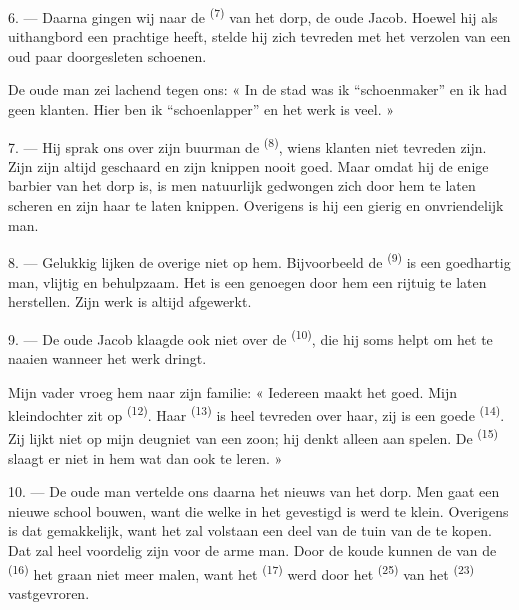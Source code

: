 6. --- Daarna gingen wij naar de  \textsuperscript{(7)} van het dorp, de
oude Jacob. Hoewel hij als uithangbord een prachtige  heeft, stelde hij zich
tevreden met het verzolen van een oud paar doorgesleten schoenen.

De oude man zei lachend tegen ons: « In de stad was ik “schoenmaker” en ik had geen klanten.
Hier ben ik “schoenlapper” en het werk is veel. »

7. --- Hij sprak ons over zijn buurman de  \textsuperscript{(8)}, wiens
klanten niet tevreden zijn. Zijn
 zijn altijd geschaard en zijn  knippen
nooit goed. Maar omdat hij de enige barbier van het dorp is, is men natuurlijk gedwongen zich
door hem te laten scheren en zijn haar te laten knippen. Overigens is hij een gierig en
onvriendelijk man.

8. --- Gelukkig lijken de overige  niet op hem. Bijvoorbeeld de
 \textsuperscript{(9)} is een goedhartig man, vlijtig en
behulpzaam. Het is een genoegen door hem een rijtuig te laten herstellen. Zijn werk is altijd
afgewerkt.

9. --- De oude Jacob klaagde ook niet over de  \textsuperscript{(10)}, die
hij soms helpt om het  te naaien wanneer het werk dringt.

Mijn vader vroeg hem naar zijn familie: « Iedereen maakt het goed. Mijn kleindochter zit op
 \textsuperscript{(12)}. Haar
 \textsuperscript{(13)} is heel tevreden over haar, zij is
een goede  \textsuperscript{(14)}. Zij lijkt niet op mijn deugniet van een
zoon; hij denkt alleen aan spelen. De  \textsuperscript{(15)} slaagt er
niet in hem wat dan ook te leren. »

\VUsaut{3.0mm}
\VUsaut{3.0mm}

10. --- De oude man vertelde ons daarna het nieuws van het dorp. Men gaat een nieuwe school
bouwen, want die welke in het  gevestigd is werd te klein. Overigens is
dat gemakkelijk, want het zal volstaan een deel van de tuin van de  te kopen.
Dat zal heel voordelig zijn voor de arme man. Door de koude kunnen de  van
de  \textsuperscript{(16)} het graan niet meer malen, want het 
\textsuperscript{(17)} werd door het  \textsuperscript{(25)} van het
 \textsuperscript{(23)} vastgevroren.

